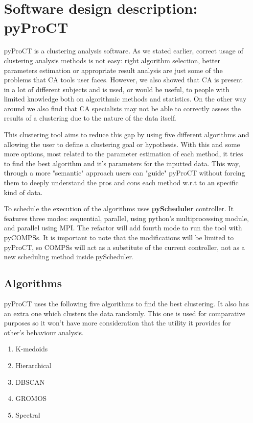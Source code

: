 \section{Software design description: pyProCT}
\label{sec:sdd}


pyProCT is a clustering analysis software. As we stated earlier, correct usage of clustering analysis methods is not easy: right algorithm selection, better parameters estimation or appropriate result analysis are just some of the problems that CA tools user faces. However, we also showed that CA is present in a lot of different subjects and is used, or would be useful, to people with  limited knowledge both on algorithmic methods and statistics. On the other way around we also find that CA specialists may not be able to correctly assess the results of a clustering due to the nature of the data itself.

This clustering tool aims to reduce this gap by using five different algorithms and allowing the user to define a clustering goal or hypothesis. With this and some more options, most related to the parameter estimation of each method, it tries to find the best algorithm and it's parameters for the inputted data. This way, through a more "semantic" approach users can "guide" pyProCT without forcing them to deeply understand the pros and cons each method w.r.t to an specific kind of data.

To schedule the execution of the algorithms uses \hyperref[sec:docs]{\textbf{pyScheduler} controller}. It features three modes: sequential, parallel, using python's multiprocessing module, and parallel using MPI. The refactor will add fourth mode to run the tool with pyCOMPSs. It is important to note that the modifications will be limited to pyProCT, so COMPSs will act as a substitute of the current controller, not as a new scheduling method inside pyScheduler.



\subsection {Algorithms}

pyProCT uses the following five algorithms to find the best clustering. It also has an extra one which clusters the data randomly. This one is used for comparative purposes so it won't have more consideration that the utility it provides for other's behaviour analysis.

\begin{enumerate}

\item{K-medoids}
\item{Hierarchical}
\item{DBSCAN}
\item{GROMOS}
\item{Spectral}

\end{enumerate}

